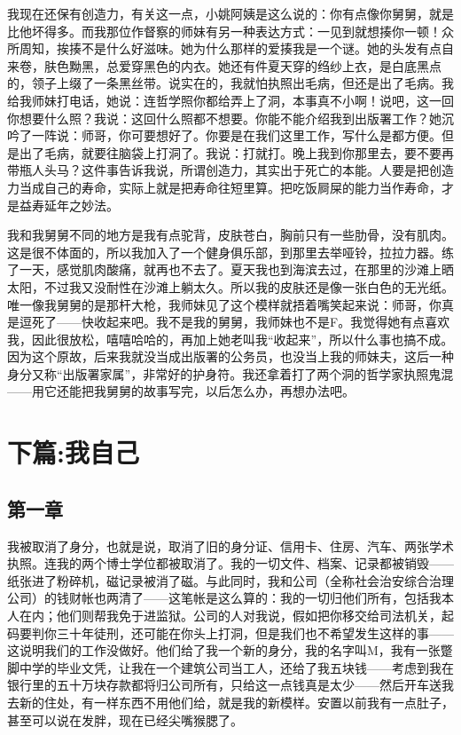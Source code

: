 我现在还保有创造力，有关这一点，小姚阿姨是这么说的：你有点像你舅舅，就是比他坏得多。而我那位作督察的师妹有另一种表达方式：一见到就想揍你一顿！众所周知，挨揍不是什么好滋味。她为什么那样的爱揍我是一个谜。她的头发有点自来卷，肤色黝黑，总爱穿黑色的内衣。她还有件夏天穿的绉纱上衣，是白底黑点的，领子上缀了一条黑丝带。说实在的，我就怕执照出毛病，但还是出了毛病。我给我师妹打电话，她说：连哲学照你都给弄上了洞，本事真不小啊！说吧，这一回你想要什么照？我说：这回什么照都不想要。你能不能介绍我到出版署工作？她沉吟了一阵说：师哥，你可要想好了。你要是在我们这里工作，写什么是都方便。但是出了毛病，就要往脑袋上打洞了。我说：打就打。晚上我到你那里去，要不要再带瓶人头马？这件事告诉我说，所谓创造力，其实出于死亡的本能。人要是把创造力当成自己的寿命，实际上就是把寿命往短里算。把吃饭屙屎的能力当作寿命，才是益寿延年之妙法。 

我和我舅舅不同的地方是我有点驼背，皮肤苍白，胸前只有一些肋骨，没有肌肉。这是很不体面的，所以我加入了一个健身俱乐部，到那里去举哑铃，拉拉力器。练了一天，感觉肌肉酸痛，就再也不去了。夏天我也到海滨去过，在那里的沙滩上晒太阳，不过我又没耐性在沙滩上躺太久。所以我的皮肤还是像一张白色的无光纸。唯一像我舅舅的是那杆大枪，我师妹见了这个模样就捂着嘴笑起来说：师哥，你真是逗死了——快收起来吧。我不是我的舅舅，我师妹也不是F。我觉得她有点喜欢我，因此很放松，嘻嘻哈哈的，再加上她老叫我“收起来”，所以什么事也搞不成。因为这个原故，后来我就没当成出版署的公务员，也没当上我的师妹夫，这后一种身分又称“出版署家属”，非常好的护身符。我还拿着打了两个洞的哲学家执照鬼混——用它还能把我舅舅的故事写完，以后怎么办，再想办法吧。

\section{下篇:我自己}

\subsection{第一章}

我被取消了身分，也就是说，取消了旧的身分证、信用卡、住房、汽车、两张学术执照。连我的两个博士学位都被取消了。我的一切文件、档案、记录都被销毁——纸张进了粉碎机，磁记录被消了磁。与此同时，我和公司（全称社会治安综合治理公司）的钱财帐也两清了——这笔帐是这么算的：我的一切归他们所有，包括我本人在内；他们则帮我免于进监狱。公司的人对我说，假如把你移交给司法机关，起码要判你三十年徒刑，还可能在你头上打洞，但是我们也不希望发生这样的事——这说明我们的工作没做好。他们给了我一个新的身分，我的名字叫M，我有一张蹩脚中学的毕业文凭，让我在一个建筑公司当工人，还给了我五块钱——考虑到我在银行里的五十万块存款都将归公司所有，只给这一点钱真是太少——然后开车送我去新的住处，有一样东西不用他们给，就是我的新模样。安置以前我有一点肚子，甚至可以说在发胖，现在已经尖嘴猴腮了。 

